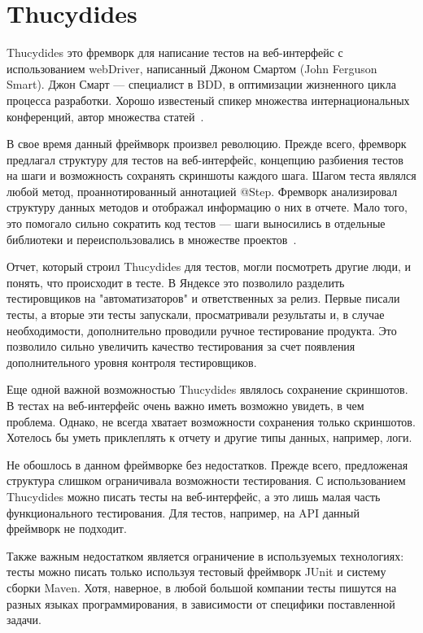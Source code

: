 \section{Thucydides}

Thucydides это фремворк для написание тестов на веб-интерфейс с использованием webDriver, написанный Джоном Смартом (John Ferguson Smart). Джон Смарт --- специалист в BDD, в оптимизации жизненного цикла процесса разработки. Хорошо известеный спикер множества интернациональных конференций, автор множества статей~\cite{john_smart_home}.

В свое время данный фреймворк произвел революцию. Прежде всего, фремворк предлагал структуру для тестов на веб-интерфейс, концепцию разбиения тестов на шаги и возможность сохранять скриншоты каждого шага. Шагом теста являлся любой метод, проаннотированный аннотацией @Step.
Фремворк анализировал структуру данных методов и отображал информацию о них в отчете. Мало того, это помогало сильно сократить код тестов --- шаги выносились в отдельные библиотеки и переиспользовались в множестве проектов~\cite{thucydides_docs}.

Отчет, который строил Thucydides для тестов, могли посмотреть другие люди, и понять, что происходит в тесте. В Яндексе это позволило разделить тестировщиков на "автоматизаторов" и ответственных за релиз. Первые писали тесты, а вторые эти тесты запускали, просматривали результаты и, в случае необходимости, дополнительно проводили ручное тестирование продукта. Это позволило сильно увеличить качество тестирования за счет появления дополнительного уровня контроля тестировщиков.

Еще одной важной возможностью Thucydides являлось сохранение скриншотов. В тестах на веб-интерфейс очень важно иметь возможно увидеть, в чем проблема. Однако, не всегда хватает возможности сохранения только скриншотов. Хотелось бы уметь приклеплять к отчету и другие типы данных, например, логи.

Не обошлось в данном фреймворке без недостатков. Прежде всего, предложеная структура слишком ограничивала возможности тестирования. С использованием Thucydides можно писать тесты на веб-интерфейс, а это лишь малая часть функционального тестирования. Для тестов, например, на API данный фреймворк не подходит.

Также важным недостатком является ограничение в используемых технологиях: тесты можно писать только используя тестовый фреймворк JUnit и систему сборки Maven. Хотя, наверное, в любой большой компании тесты пишутся на разных языках программирования, в зависимости от специфики поставленной задачи.  

